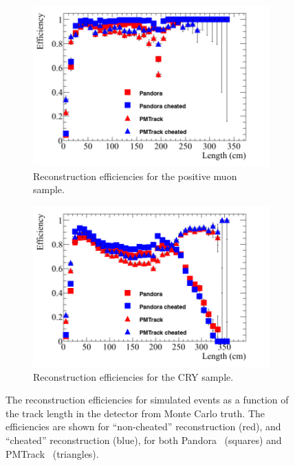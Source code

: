 \begin{figure}
  \centering
  \begin{subfigure}{0.48\textwidth}
    \centering
    \includegraphics[width=\textwidth]{Effic_AntiMuon_500V_All_Length}
    \caption{Reconstruction efficiencies for the positive muon sample.}
    \label{fig:SimEffic_Length_AMu}
  \end{subfigure}%
  \hspace{0.03\textwidth}%
  \begin{subfigure}{0.48\textwidth}
    \centering
    \includegraphics[width=\textwidth]{Effic_Cosmics_500V_All_Length}
    \caption{Reconstruction efficiencies for the CRY sample.}
    \label{fig:SimEffic_Length_CRY}
  \end{subfigure}
  \caption[The reconstruction efficiencies for simulated events as a function of the track length in the detector from Monte Carlo truth.]
          {The reconstruction efficiencies for simulated events as a function of the track length in the detector from Monte Carlo truth. The efficiencies are shown for ``non-cheated'' reconstruction (red), and ``cheated'' reconstruction (blue), for both Pandora~\citep{Pandora} (squares) and PMTrack~\citep{PMTrack} (triangles).}
          \label{fig:SimEffic_Length}
\end{figure}

